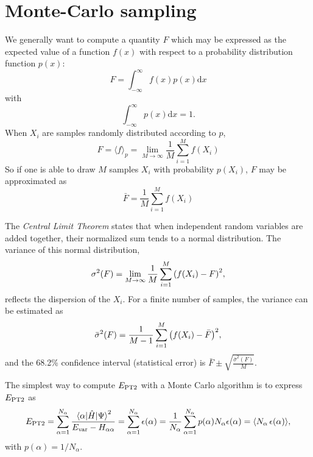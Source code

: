 \documentclass[./thesis.tex]{subfiles}
\begin{document}
\section{Monte-Carlo sampling}

We generally want to compute a quantity $F$ which may be expressed as the expected value of a function $f(x)$ with respect to a probability distribution function $p(x)$:
\begin{equation}
F = \int_{-\infty}^\infty f(x) p(x) \text{d} x
\end{equation}
with 
\begin{equation}
\int_{-\infty}^\infty p(x) \text{d} x = 1.
\end{equation}
When $X_i$ are samples randomly distributed according to $p$, 
\begin{equation}
\label{eq:sum_mc}
F = \langle f \rangle_p =  \lim_{M\rightarrow \infty} \frac{1}{M} \sum_{i=1}^{M} f(X_i)
\end{equation}
So if one is able to draw $M$ samples $X_i$ with probability $p(X_i)$, $F$ may be approximated as
\begin{equation}
\bar{F} = \frac{1}{M} \sum_{i=1}^{M} f(X_i)
\end{equation}

The \emph{Central Limit Theorem} states that when independent random variables are added together, their normalized sum tends to a normal distribution. The variance of this normal distribution, 
\begin{equation}
\sigma^2(F) = \lim_{M\rightarrow \infty} \frac{1}{M} \sum_{i=1}^{M} \qty( f(X_i) - F)^2,
\end{equation}
reflects the dispersion of the $X_i$.
For a finite number of samples, the variance can be estimated as
\begin{equation}
\bar{\sigma}^2(F) = \frac{1}{M-1} \sum_{i=1}^{M} \qty( f(X_i) - \bar{F})^2,
\end{equation}
and the 68.2\% confidence interval (statistical error) is $\bar{F} \pm \sqrt{\frac{\bar{\sigma}^2(F)}{M}}$.

The simplest way to compute $E_\text{PT2}$ with a Monte Carlo algorithm is to express $E_\text{PT2}$ as
\begin{equation}
E_\text{PT2} = \sum_{\alpha = 1}^{N_\alpha} \frac{ \mel{\alpha}{\hat{H}}{\Psi}^2 }{E_\text{var} - H_{\alpha \alpha} } = \sum_{\alpha = 1}^{N_\alpha} \epsilon(\alpha) = \frac{1}{N_\alpha} \sum_{\alpha = 1}^{N_\alpha} p(\alpha) N_\alpha \epsilon(\alpha) = \langle N_\alpha\, \epsilon(\alpha) \rangle,
\end{equation}
with $p(\alpha) = 1 / N_\alpha$.
\end{document}
